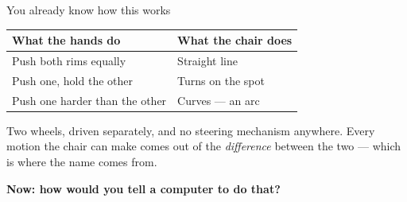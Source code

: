 \documentclass[aspectratio=169]{beamer}
\begin{document}
\begin{frame}{You already know how this works}

  \vspace{1.0em}
  \small
  \begin{center}
  \begin{tabular}{@{}p{5.4cm}p{5.4cm}@{}}
    \toprule
    \textbf{What the hands do} & \textbf{What the chair does} \\
    \midrule
    Push both rims equally     & Straight line \\[0.3em]
    Push one, hold the other   & Turns on the spot \\[0.3em]
    Push one harder than the other & Curves --- an arc \\
    \bottomrule
  \end{tabular}
  \end{center}

  \vspace{1.0em}
  Two wheels, driven separately, and no steering mechanism anywhere. Every motion the chair
  can make comes out of the \emph{difference} between the two --- which is where the name
  comes from.

  \vspace{0.5em}
  \centering\small
  \textbf{Now: how would you tell a computer to do that?}
\end{frame}
\end{document}
